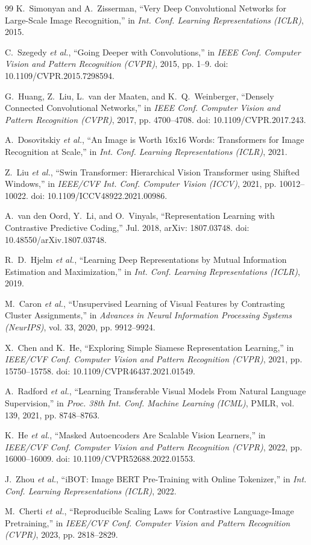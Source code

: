 \documentclass[journal,article,submit,moreauthors,pdftex]{Definitions/tsp}
\begin{document}
\begin{thebibliography}{99}
K.~Simonyan and A.~Zisserman, ``Very Deep Convolutional Networks for Large-Scale Image Recognition,'' in \emph{Int. Conf. Learning Representations (ICLR)}, 2015.

C.~Szegedy \emph{et al.}, ``Going Deeper with Convolutions,'' in \emph{IEEE Conf. Computer Vision and Pattern Recognition (CVPR)}, 2015, pp. 1--9. doi: 10.1109/CVPR.2015.7298594.

G.~Huang, Z.~Liu, L.~van der Maaten, and K.~Q.~Weinberger, ``Densely Connected Convolutional Networks,'' in \emph{IEEE Conf. Computer Vision and Pattern Recognition (CVPR)}, 2017, pp. 4700--4708. doi: 10.1109/CVPR.2017.243.

A.~Dosovitskiy \emph{et al.}, ``An Image is Worth 16x16 Words: Transformers for Image Recognition at Scale,'' in \emph{Int. Conf. Learning Representations (ICLR)}, 2021.

Z.~Liu \emph{et al.}, ``Swin Transformer: Hierarchical Vision Transformer using Shifted Windows,'' in \emph{IEEE/CVF Int. Conf. Computer Vision (ICCV)}, 2021, pp. 10012--10022. doi: 10.1109/ICCV48922.2021.00986.

A.~van den Oord, Y.~Li, and O.~Vinyals, ``Representation Learning with Contrastive Predictive Coding,'' Jul. 2018, arXiv: 1807.03748. doi: 10.48550/arXiv.1807.03748.

R.~D.~Hjelm \emph{et al.}, ``Learning Deep Representations by Mutual Information Estimation and Maximization,'' in \emph{Int. Conf. Learning Representations (ICLR)}, 2019.

M.~Caron \emph{et al.}, ``Unsupervised Learning of Visual Features by Contrasting Cluster Assignments,'' in \emph{Advances in Neural Information Processing Systems (NeurIPS)}, vol. 33, 2020, pp. 9912--9924.

X.~Chen and K.~He, ``Exploring Simple Siamese Representation Learning,'' in \emph{IEEE/CVF Conf. Computer Vision and Pattern Recognition (CVPR)}, 2021, pp. 15750--15758. doi: 10.1109/CVPR46437.2021.01549.

A.~Radford \emph{et al.}, ``Learning Transferable Visual Models From Natural Language Supervision,'' in \emph{Proc. 38th Int. Conf. Machine Learning (ICML)}, PMLR, vol. 139, 2021, pp. 8748--8763.

K.~He \emph{et al.}, ``Masked Autoencoders Are Scalable Vision Learners,'' in \emph{IEEE/CVF Conf. Computer Vision and Pattern Recognition (CVPR)}, 2022, pp. 16000--16009. doi: 10.1109/CVPR52688.2022.01553.

J.~Zhou \emph{et al.}, ``iBOT: Image BERT Pre-Training with Online Tokenizer,'' in \emph{Int. Conf. Learning Representations (ICLR)}, 2022.

M.~Cherti \emph{et al.}, ``Reproducible Scaling Laws for Contrastive Language-Image Pretraining,'' in \emph{IEEE/CVF Conf. Computer Vision and Pattern Recognition (CVPR)}, 2023, pp. 2818--2829.

\end{thebibliography}
\end{document}
